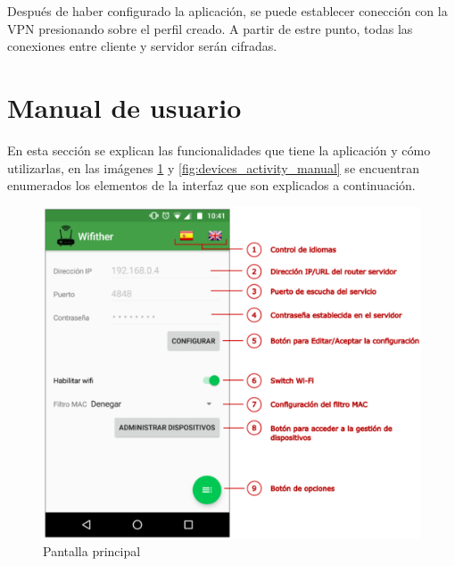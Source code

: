 \documentclass{article}
\begin{document}
            Después de haber configurado la aplicación, se puede establecer conección con la VPN presionando sobre el perfil creado. A partir de estre punto, todas las conexiones entre cliente y servidor serán cifradas.
            
    
\section{Manual de usuario}
    En esta sección se explican las funcionalidades que tiene la aplicación y cómo utilizarlas, en las imágenes \ref{fig:main_activity_manual} y \ref{fig:devices_activity_manual} se encuentran enumerados los elementos de la interfaz que son explicados a continuación.

    \begin{figure}[h!]
        \centering
            \includegraphics[scale=0.5]{main_activity_manual.eps}
            \caption*{Pantalla principal}
            \label{fig:main_activity_manual}
    \end{figure}
\end{document}
